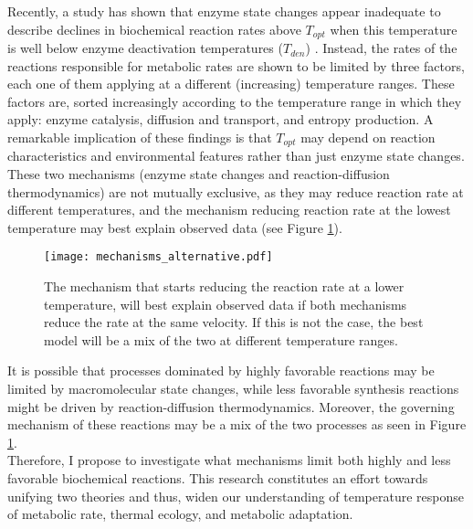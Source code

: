 \documentclass[titlepage,11pt]{article}
\begin{document}
\begin{linenumbers}
		Recently, a study has shown that enzyme state changes appear inadequate to describe declines in biochemical reaction rates above $ T_{opt} $  when this temperature is well below enzyme deactivation temperatures ($ T_{den} $) \cite{Ritchie2018}. Instead, the rates of the reactions responsible for metabolic rates are shown to be limited by three factors, each one of them applying at a different (increasing) temperature ranges. These factors are, sorted increasingly according to the temperature range in which they apply: enzyme catalysis, diffusion and transport, and entropy production. A remarkable implication of these findings is that $ T_{opt} $ may depend on reaction characteristics and environmental features rather than just enzyme state changes.\\
		These two mechanisms (enzyme state changes and reaction-diffusion thermodynamics) are not mutually exclusive, as they may reduce reaction rate at different temperatures, and the mechanism reducing reaction rate at the lowest temperature may best explain observed data (see Figure \ref{alternative_mechanisms}).\\
		\begin{figure}\label{alternative_mechanisms}
			\centering
			\texttt{[image: mechanisms\_alternative.pdf]}
			\caption{The mechanism that starts reducing the reaction rate at a lower temperature, will best explain observed data if both mechanisms reduce the rate at the same velocity. If this is not the case, the best model will be a mix of the two at different temperature ranges.}
		\end{figure}It is possible that processes dominated by highly favorable reactions may be limited by macromolecular state changes, while less favorable synthesis reactions might be driven by reaction-diffusion thermodynamics. Moreover, the governing mechanism of these reactions may be a mix of the two processes as seen in Figure \ref{alternative_mechanisms}.\\
		Therefore, I propose to investigate what mechanisms limit both highly and less favorable biochemical reactions. This research constitutes an effort towards unifying two theories and thus, widen our understanding of temperature response of metabolic rate, thermal ecology, and metabolic adaptation. 
		

\end{linenumbers}
\end{document}
